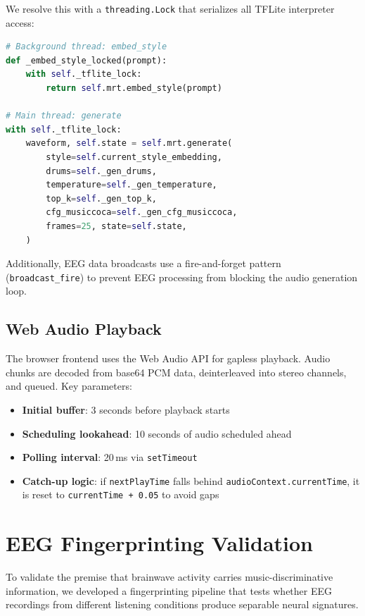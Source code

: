 \documentclass[manuscript,review,anonymous]{acmart}
\begin{document}
We resolve this with a \texttt{threading.Lock} that serializes all TFLite interpreter access:

\begin{lstlisting}[language=Python]
# Background thread: embed_style
def _embed_style_locked(prompt):
    with self._tflite_lock:
        return self.mrt.embed_style(prompt)

# Main thread: generate
with self._tflite_lock:
    waveform, self.state = self.mrt.generate(
        style=self.current_style_embedding,
        drums=self._gen_drums,
        temperature=self._gen_temperature,
        top_k=self._gen_top_k,
        cfg_musiccoca=self._gen_cfg_musiccoca,
        frames=25, state=self.state,
    )
\end{lstlisting}

Additionally, EEG data broadcasts use a fire-and-forget pattern (\texttt{broadcast\_fire}) to prevent EEG processing from blocking the audio generation loop.

\subsection{Web Audio Playback}

The browser frontend uses the Web Audio API for gapless playback. Audio chunks are decoded from base64 PCM data, deinterleaved into stereo channels, and queued. Key parameters:

\begin{itemize}[nosep]
  \item \textbf{Initial buffer}: 3 seconds before playback starts
  \item \textbf{Scheduling lookahead}: 10 seconds of audio scheduled ahead
  \item \textbf{Polling interval}: 20\,ms via \texttt{setTimeout}
  \item \textbf{Catch-up logic}: if \texttt{nextPlayTime} falls behind \texttt{audioContext.currentTime}, it is reset to \texttt{currentTime + 0.05} to avoid gaps
\end{itemize}

\section{EEG Fingerprinting Validation}

To validate the premise that brainwave activity carries music-discriminative information, we developed a fingerprinting pipeline that tests whether EEG recordings from different listening conditions produce separable neural signatures.
\end{document}
